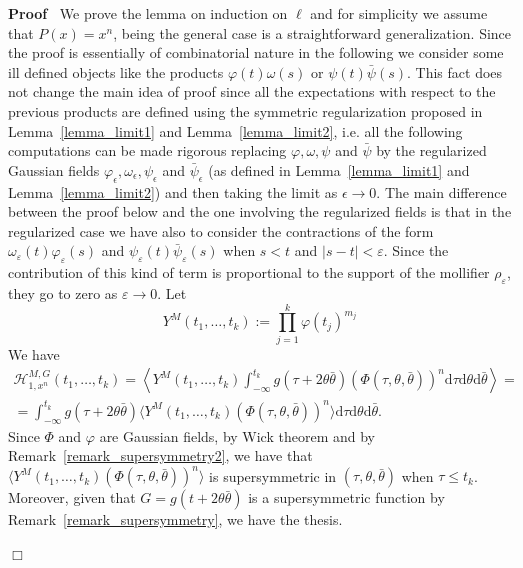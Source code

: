 \documentclass[a4paper,10pt]{article}
\newcommand{\assign}{:=}
\newcommand{\mathd}{\mathrm{d}}
\newenvironment{proof}{\noindent\textbf{Proof\ }}{\hspace*{\fill}$\Box$\medskip}
\begin{document}
\begin{proof}
  We prove the lemma on induction on $\ell$ and for simplicity we assume that
  $P (x) = x^n$, being the general case is a straightforward generalization.
  Since the proof is essentially of combinatorial nature in the following we
  consider some ill defined objects like the products $\varphi (t) \omega (s)$
  or $\psi (t) \bar{\psi} (s)$. This fact does not change the main idea of
  proof since all the expectations with respect to the previous products are
  defined using the symmetric regularization proposed in
  Lemma~\ref{lemma_limit1} and Lemma~\ref{lemma_limit2}, i.e. all the
  following computations can be made rigorous replacing $\varphi, \omega,
  \psi$ and $\bar{\psi}$ by the regularized Gaussian fields
  $\varphi_{\epsilon}, \omega_{\epsilon}, \psi_{\epsilon}$ and
  $\bar{\psi}_{\epsilon}$ (as defined in Lemma~\ref{lemma_limit1} and
  Lemma~\ref{lemma_limit2}) and then taking the limit as $\epsilon \rightarrow
  0$. The main difference between the proof below and the one involving the
  regularized fields is that in the regularized case we have also to consider
  the contractions of the form $\omega_{\varepsilon} (t) \varphi_{\varepsilon}
  (s)$ and $\psi_{\varepsilon} (t) \bar{\psi}_{\varepsilon} (s)$ when $s < t$
  and $| s - t | < \varepsilon$. Since the contribution of this kind of term
  is proportional to the support of the mollifier $\rho_{\varepsilon}$, they
  go to zero as $\varepsilon \rightarrow 0$. Let
  \[ Y^M (t_1, \ldots, t_k) \assign \prod_{j = 1}^k \varphi (t_j)^{m_j} \]
  We have
  \begin{multline*} \mathcal{H}^{M, G}_{1, x^n} (t_1, \ldots, t_k) = \left\langle Y^M (t_1,
     \ldots, t_k) \int_{- \infty}^{t_k} g (\tau + 2 \theta \bar{\theta}) (\Phi
     (\tau, \theta, \bar{\theta}))^n \mathd \tau \mathd \theta \mathd
     \bar{\theta} \right\rangle = \\
   = \int_{- \infty}^{t_k} g (\tau + 2 \theta \bar{\theta}) \langle Y^M
     (t_1, \ldots, t_k) (\Phi (\tau, \theta, \bar{\theta}))^n \rangle \mathd
     \tau \mathd \theta \mathd \bar{\theta} . \end{multline*}
  Since $\Phi$ and $\varphi$ are Gaussian fields, by Wick theorem and by
  Remark~\ref{remark_supersymmetry2}, we have that $\langle Y^M (t_1, \ldots,
  t_k) (\Phi (\tau, \theta, \bar{\theta}))^n \rangle$ is supersymmetric in
  $(\tau, \theta, \bar{\theta})$ when $\tau \leqslant t_k$. Moreover, given
  that $G = g (t + 2 \theta \bar{\theta})$ is a supersymmetric function by
  Remark~\ref{remark_supersymmetry}, we have the thesis.
  

\end{proof}
\end{document}
